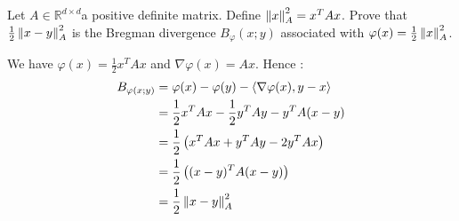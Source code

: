 \begin{exercise}[]{}
	Let $ A\in \mathbb{R}^{d\times d} $a positive definite matrix. Define $ \left\|x\right\|_A^2 = x^TAx $. Prove that $ \frac{1}{2}\left\|x-y\right\|_A^2 $ is the Bregman divergence $ B_{\varphi}(x ;y) $ associated with $ \varphi(x) = \frac{1}{2}\left\|x\right\|_A^2 $.
\end{exercise}

\begin{solution}[]
	We have $ \varphi(x) = \frac{1}{2}x^TAx $ and $ \nabla \varphi(x) = Ax $. Hence :
\begin{align*}
	B_{\varphi(x ;y)} &= \varphi(x) - \varphi(y) - \langle\nabla \varphi(x),y-x\rangle \\
			  &= \frac{1}{2}x^TAx - \frac{1}{2}y^TAy - y^TA(x-y) \\
			  &= \frac{1}{2}\left( x^TAx + y^TAy - 2y^TAx \right) \\
			  &= \frac{1}{2}\left( (x-y)^TA(x-y) \right) \\
			  &= \frac{1}{2}\left\|x-y\right\|_A^2
\end{align*}

\end{solution}
